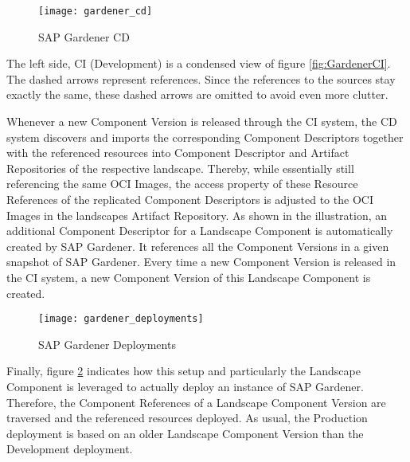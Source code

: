 \begin{figure}[H]
	\centering
	\texttt{[image: gardener\_cd]}
	\caption[SAP Gardener CD]{SAP Gardener CD }
	\label{fig:GardenerCD}
\end{figure}
 
The left side, CI (Development) is a condensed view of figure \ref{fig:GardenerCI}. The dashed arrows represent references. Since the references to the sources stay exactly the same, these dashed arrows are omitted to avoid even more clutter.\par 
Whenever a new Component Version is released through the CI system, the CD system discovers and imports the corresponding Component Descriptors together with the referenced resources into Component Descriptor and Artifact Repositories of the respective landscape. Thereby, while essentially still referencing the same OCI Images, the access property of these Resource References of the replicated Component Descriptors is adjusted to the OCI Images in the landscapes Artifact Repository. As shown in the illustration, an additional Component Descriptor for a Landscape Component is automatically created by SAP Gardener. It references all the Component Versions in a given snapshot of SAP Gardener. Every time a new Component Version is released in the CI system, a new Component Version of this Landscape Component is created.\par 

\begin{figure}[H]
	\centering
	\texttt{[image: gardener\_deployments]}
	\caption[SAP Gardener Deployments]{SAP Gardener Deployments }
	\label{fig:GardenerDeployments}
\end{figure}

Finally, figure \ref{fig:GardenerDeployments} indicates how this setup and particularly the Landscape Component is leveraged to actually deploy an instance of SAP Gardener. Therefore, the Component References of a Landscape Component Version are traversed and the referenced resources deployed. As usual, the Production deployment is based on an older Landscape Component Version than the Development deployment. 


